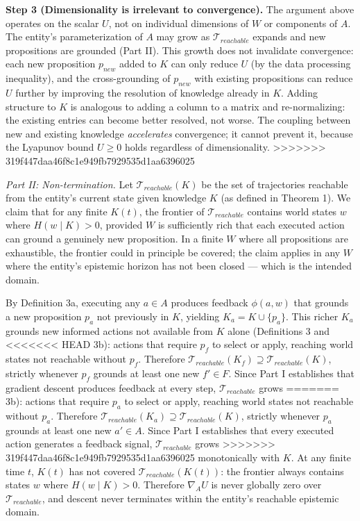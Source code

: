 \documentclass[
]{article}
\begin{document}
\textbf{Step 3 (Dimensionality is irrelevant to convergence).} The
argument above operates on the scalar \(U\), not on individual
dimensions of \(W\) or components of \(A\). The entity's
parameterization of \(A\) may grow as
\(\mathcal{T}_{reachable}\) expands and new propositions are grounded
(Part II). This growth does not invalidate convergence: each new
proposition \(p_{new}\) added to \(K\) can only reduce \(U\) (by the
data processing inequality), and the cross-grounding of \(p_{new}\) with
existing propositions can reduce \(U\) further by improving the
resolution of knowledge already in \(K\). Adding structure to \(K\) is
analogous to adding a column to a matrix and re-normalizing: the
existing entries can become better resolved, not worse. The coupling
between new and existing knowledge \emph{accelerates} convergence; it
cannot prevent it, because the Lyapunov bound \(U \geq 0\) holds
regardless of dimensionality.
>>>>>>> 319f447daa46f8c1e949fb7929535d1aa6396025

\emph{Part II: Non-termination.} Let \(\mathcal{T}_{reachable}(K)\) be
the set of trajectories reachable from the entity's current state given
knowledge \(K\) (as defined in Theorem 1). We claim that for any finite
\(K(t)\), the frontier of \(\mathcal{T}_{reachable}\) contains world
states \(w\) where \(H(w \mid K) > 0\), provided \(W\) is sufficiently
rich that each executed action can ground a genuinely new proposition.
In a finite \(W\) where all propositions are exhaustible, the frontier
could in principle be covered; the claim applies in any \(W\) where the
entity's epistemic horizon has not been closed --- which is the intended
domain.

By Definition 3a, executing any \(a \in A\) produces feedback
\(\phi(a, w)\) that grounds a new proposition \(p_a\) not previously in
\(K\), yielding \(K_a = K \cup \{p_a\}\). This richer \(K_a\) grounds
new informed actions not available from \(K\) alone (Definitions 3 and
<<<<<<< HEAD
3b): actions that require \(p_f\) to select or apply, reaching world
states not reachable without \(p_f\). Therefore
\(\mathcal{T}_{reachable}(K_f) \supseteq
\mathcal{T}_{reachable}(K)\), strictly whenever \(p_f\) grounds at least
one new \(f' \in F\). Since Part I establishes that gradient descent
produces feedback at every step, \(\mathcal{T}_{reachable}\) grows
=======
3b): actions that require \(p_a\) to select or apply, reaching world
states not reachable without \(p_a\). Therefore
\(\mathcal{T}_{reachable}(K_a) \supseteq
\mathcal{T}_{reachable}(K)\), strictly whenever \(p_a\) grounds at least
one new \(a' \in A\). Since Part I establishes that every executed
action generates a feedback signal, \(\mathcal{T}_{reachable}\) grows
>>>>>>> 319f447daa46f8c1e949fb7929535d1aa6396025
monotonically with \(K\). At any finite time \(t\), \(K(t)\) has not
covered \(\mathcal{T}_{reachable}(K(t))\): the frontier always contains
states \(w\) where \(H(w \mid K) > 0\). Therefore \(\nabla_A U\) is
never globally zero over \(\mathcal{T}_{reachable}\), and descent never
terminates within the entity's reachable epistemic domain.
\end{document}
